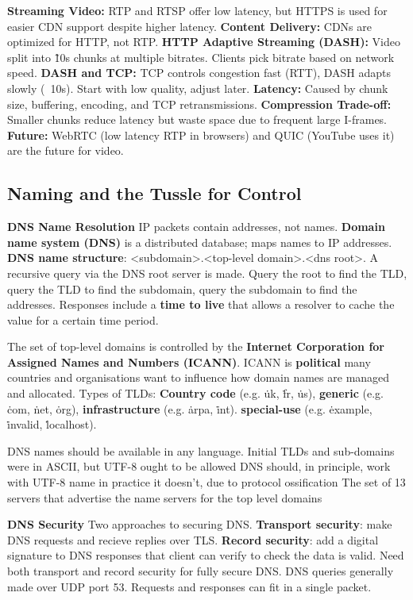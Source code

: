 \documentclass{article}
\begin{document}
\textbf{Streaming Video:}
RTP and RTSP offer low latency, but HTTPS is used for easier CDN support despite higher latency.
\textbf{Content Delivery:}
CDNs are optimized for HTTP, not RTP\@.
\textbf{HTTP Adaptive Streaming (DASH):}
Video split into \~10s chunks at multiple bitrates. Clients pick bitrate based on network speed.
\textbf{DASH and TCP:}
TCP controls congestion fast (RTT), DASH adapts slowly (~10s). Start with low quality, adjust later.
\textbf{Latency:}
Caused by chunk size, buffering, encoding, and TCP retransmissions.
\textbf{Compression Trade-off:}
Smaller chunks reduce latency but waste space due to frequent large I-frames.
\textbf{Future:}
WebRTC (low latency RTP in browsers) and QUIC (YouTube uses it) are the future for video.


\subsection*{Naming and the Tussle for Control}

\textbf{DNS Name Resolution}
IP packets contain addresses, not names.
\textbf{Domain name system (DNS)} is a distributed database; maps names to IP addresses.
\textbf{DNS name structure}: <subdomain>.<top-level domain>.<dns root>.
A recursive query via the DNS root server is made. Query the root to find the TLD, query the TLD to find the subdomain,
query the subdomain to find the addresses.
Responses include a \textbf{time to live} that allows a resolver to cache the value for a certain time period.

The set of top-level domains is controlled by the \textbf{Internet Corporation for Assigned Names and Numbers (ICANN)}.
ICANN is \textbf{political} \- many countries and organisations want to influence how domain names are managed and allocated.
Types of TLDs:
\textbf{Country code} (e.g. \.uk, \.fr, \.us),
\textbf{generic} (e.g. \.com, \.net, \.org),
\textbf{infrastructure} (e.g. \.arpa, \.int).
\textbf{special-use} (e.g. \.example, \.invalid, \.localhost).

DNS names should be available in any language. Initial TLDs and sub-domains were in ASCII, but UTF-8 ought to be allowed
DNS should, in principle, work with UTF-8 name \- in practice it doesn't, due to protocol ossification
The set of 13 servers that advertise the name servers for the top level domains

\textbf{DNS Security}
Two approaches to securing DNS.
\textbf{Transport security}: make DNS requests and recieve replies over TLS\@.
\textbf{Record security}: add a digital signature to DNS responses that client can verify to check the data is valid.
Need both transport and record security for fully secure DNS\@.
DNS queries generally made over UDP port 53. Requests and responses can fit in a single packet.
\end{document}
